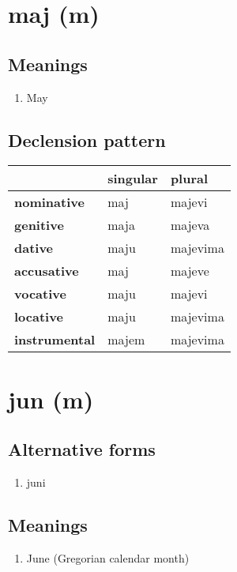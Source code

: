 \filbreak
\section{maj (m)}
\subsection*{Meanings}
\begin{enumerate}
\item May
\end{enumerate}
\subsection*{Declension pattern}
\begin{tabularx}{\linewidth}{Xll}
\toprule
{} & singular &    plural \\
\midrule
\textbf{nominative  } &      maj &    majevi \\
\textbf{genitive    } &     maja &    majeva \\
\textbf{dative      } &     maju &  majevima \\
\textbf{accusative  } &      maj &    majeve \\
\textbf{vocative    } &     maju &    majevi \\
\textbf{locative    } &     maju &  majevima \\
\textbf{instrumental} &    majem &  majevima \\
\bottomrule
\end{tabularx}

\filbreak
\section{jun (m)}
\subsection*{Alternative forms}
\begin{enumerate}
\item juni
\end{enumerate}
\subsection*{Meanings}
\begin{enumerate}
\item June (Gregorian calendar month)
\end{enumerate}
